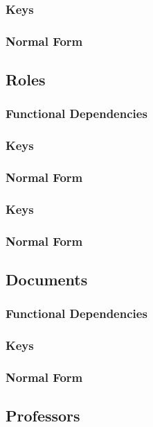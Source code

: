 \documentclass[11pt]{article}
\begin{document}
\subsubsection*{Keys}
\label{sec-3-1-2}
\subsubsection*{Normal Form}
\label{sec-3-1-3}
\subsection*{Roles}
\label{sec-3-2}
\subsubsection*{Functional Dependencies}
\label{sec-3-2-1}
\subsubsection*{Keys}
\label{sec-3-2-2}
\subsubsection*{Normal Form}
\label{sec-3-2-3}
\subsubsection*{Keys}
\label{sec-3-2-4}
\subsubsection*{Normal Form}
\label{sec-3-2-5}
\subsection*{Documents}
\label{sec-3-3}
\subsubsection*{Functional Dependencies}
\label{sec-3-3-1}
\subsubsection*{Keys}
\label{sec-3-3-2}
\subsubsection*{Normal Form}
\label{sec-3-3-3}
\subsection*{Professors}
\label{sec-3-4}
\end{document}

